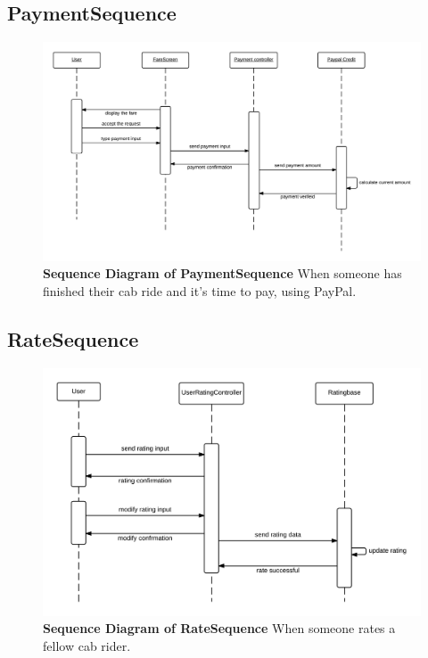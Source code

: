 \documentclass[]{article}
\begin{document}
\subsection{PaymentSequence}

\begin{figure}[H]
\label{paySeq}
	\centering
	\includegraphics[width=1\textwidth]{PaymentSequence.png}
	\caption{\textbf{Sequence Diagram of PaymentSequence} When someone has finished their cab ride and it's time to pay, using PayPal.}
\end{figure}

\subsection{RateSequence}

\begin{figure}[H]
\label{raSeq}
	\centering
	\includegraphics[width=1\textwidth]{RateSequence.png}
	\caption{\textbf{Sequence Diagram of RateSequence} When someone rates a fellow cab rider.}
\end{figure}
\end{document}
